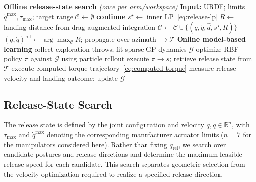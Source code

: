 \documentclass[letterpaper, 10 pt, conference]{ieeeconf}
\begin{document}
\begin{algorithm}[t]
\caption{Constraint-Aware Model-Based Pick-Throw-Place}
\label{alg:pipeline}
\begin{algorithmic}[1]
\Statex \textbf{Offline release-state search} \emph{(once per arm/workspace)}
\State \textbf{Input:} URDF; limits $\dot q^{\max},\tau_{\max}$; target range
\State $\mathcal{C}\gets\emptyset$
        \State \textbf{continue}
    \EndIf
        \State $s^\star\gets$ inner LP~\eqref{eq:release-lp}
        \State $R\gets$ landing distance from drag-augmented integration
        \State $\mathcal{C}\gets
        \mathcal{C}\cup\{(q,\dot q,\hat d,s^\star,R)\}$
    \EndIf
    \EndFor
\EndFor
\State $(q,\dot q)^{\mathrm{rel}}\gets
\arg\max_{\mathcal{C}}R$; propagate over azimuth $\rightarrow\mathcal{T}$
\Statex \textbf{Online model-based learning}
\State collect exploration throws; fit sparse GP dynamics $\mathcal{G}$
    \State optimize RBF policy $\pi$ against $\mathcal{G}$ using particle rollout
    \State execute $\pi\rightarrow s$; retrieve release state from $\mathcal{T}$
    \State execute computed-torque trajectory~\eqref{eq:computed-torque}
    \State measure release velocity and landing outcome; update $\mathcal{G}$
\EndFor
\end{algorithmic}
\end{algorithm}

\subsection{Release-State Search}
\label{sec:method-search}

The release state is defined by the joint configuration and velocity
$q,\dot q\in\mathbb{R}^{n}$, with $\tau_{\max}$ and $\dot q^{\max}$ denoting the
corresponding manufacturer actuator limits ($n=7$ for the manipulators
considered here). Rather than fixing $q_{\mathrm{rel}}$, we search over candidate
postures and release directions and determine the maximum feasible release
speed for each candidate. This search separates geometric selection from the
velocity optimization required to realize a specified release direction.
\end{document}
